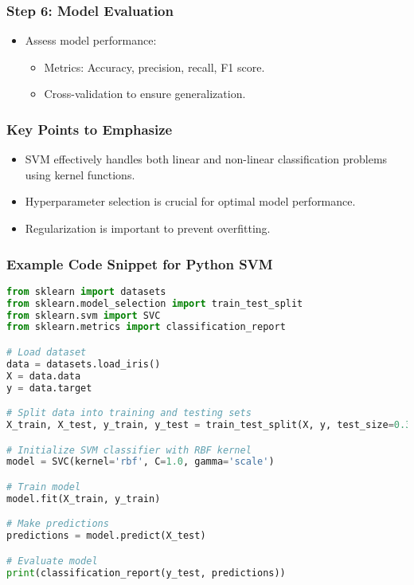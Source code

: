 \documentclass{beamer}
\begin{document}
\begin{frame}[fragile]
    \frametitle{Step 6: Model Evaluation}
    \begin{itemize}
        \item Assess model performance:
        \begin{itemize}
            \item Metrics: Accuracy, precision, recall, F1 score.
            \item Cross-validation to ensure generalization.
        \end{itemize}
    \end{itemize}
\end{frame}

\begin{frame}[fragile]
    \frametitle{Key Points to Emphasize}
    \begin{itemize}
        \item SVM effectively handles both linear and non-linear classification problems using kernel functions.
        \item Hyperparameter selection is crucial for optimal model performance.
        \item Regularization is important to prevent overfitting.
    \end{itemize}
\end{frame}

\begin{frame}[fragile]
    \frametitle{Example Code Snippet for Python SVM}
    \begin{lstlisting}[language=Python]
from sklearn import datasets
from sklearn.model_selection import train_test_split
from sklearn.svm import SVC
from sklearn.metrics import classification_report

# Load dataset
data = datasets.load_iris()
X = data.data
y = data.target

# Split data into training and testing sets
X_train, X_test, y_train, y_test = train_test_split(X, y, test_size=0.3)

# Initialize SVM classifier with RBF kernel
model = SVC(kernel='rbf', C=1.0, gamma='scale')

# Train model
model.fit(X_train, y_train)

# Make predictions
predictions = model.predict(X_test)

# Evaluate model
print(classification_report(y_test, predictions))
    \end{lstlisting}
\end{frame}
\end{document}
